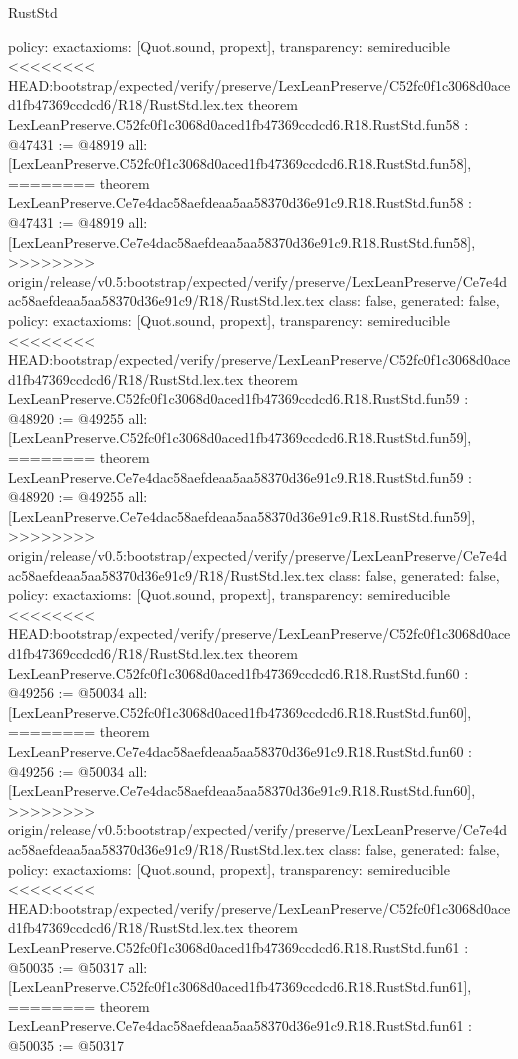 \begin{lexlean}{RustStd}
\begin{coremodule}
{\begin{coremodule}
{{{{{{{{{{{{{{{{{{{{{{{{{{{{{{{{{{{{{{{{{{{{{{{{{{{{{{{{{{{{{  policy: exact{axioms: [Quot.sound, propext]},
  transparency: semireducible
}
<<<<<<<< HEAD:bootstrap/expected/verify/preserve/LexLeanPreserve/C52fc0f1c3068d0aced1fb47369ccdcd6/R18/RustStd.lex.tex
theorem LexLeanPreserve.C52fc0f1c3068d0aced1fb47369ccdcd6.R18.RustStd.fun58 : @47431 := @48919 {
  all: [LexLeanPreserve.C52fc0f1c3068d0aced1fb47369ccdcd6.R18.RustStd.fun58],
========
theorem LexLeanPreserve.Ce7e4dac58aefdeaa5aa58370d36e91c9.R18.RustStd.fun58 : @47431 := @48919 {
  all: [LexLeanPreserve.Ce7e4dac58aefdeaa5aa58370d36e91c9.R18.RustStd.fun58],
>>>>>>>> origin/release/v0.5:bootstrap/expected/verify/preserve/LexLeanPreserve/Ce7e4dac58aefdeaa5aa58370d36e91c9/R18/RustStd.lex.tex
  class: false,
  generated: false,
  policy: exact{axioms: [Quot.sound, propext]},
  transparency: semireducible
}
<<<<<<<< HEAD:bootstrap/expected/verify/preserve/LexLeanPreserve/C52fc0f1c3068d0aced1fb47369ccdcd6/R18/RustStd.lex.tex
theorem LexLeanPreserve.C52fc0f1c3068d0aced1fb47369ccdcd6.R18.RustStd.fun59 : @48920 := @49255 {
  all: [LexLeanPreserve.C52fc0f1c3068d0aced1fb47369ccdcd6.R18.RustStd.fun59],
========
theorem LexLeanPreserve.Ce7e4dac58aefdeaa5aa58370d36e91c9.R18.RustStd.fun59 : @48920 := @49255 {
  all: [LexLeanPreserve.Ce7e4dac58aefdeaa5aa58370d36e91c9.R18.RustStd.fun59],
>>>>>>>> origin/release/v0.5:bootstrap/expected/verify/preserve/LexLeanPreserve/Ce7e4dac58aefdeaa5aa58370d36e91c9/R18/RustStd.lex.tex
  class: false,
  generated: false,
  policy: exact{axioms: [Quot.sound, propext]},
  transparency: semireducible
}
<<<<<<<< HEAD:bootstrap/expected/verify/preserve/LexLeanPreserve/C52fc0f1c3068d0aced1fb47369ccdcd6/R18/RustStd.lex.tex
theorem LexLeanPreserve.C52fc0f1c3068d0aced1fb47369ccdcd6.R18.RustStd.fun60 : @49256 := @50034 {
  all: [LexLeanPreserve.C52fc0f1c3068d0aced1fb47369ccdcd6.R18.RustStd.fun60],
========
theorem LexLeanPreserve.Ce7e4dac58aefdeaa5aa58370d36e91c9.R18.RustStd.fun60 : @49256 := @50034 {
  all: [LexLeanPreserve.Ce7e4dac58aefdeaa5aa58370d36e91c9.R18.RustStd.fun60],
>>>>>>>> origin/release/v0.5:bootstrap/expected/verify/preserve/LexLeanPreserve/Ce7e4dac58aefdeaa5aa58370d36e91c9/R18/RustStd.lex.tex
  class: false,
  generated: false,
  policy: exact{axioms: [Quot.sound, propext]},
  transparency: semireducible
}
<<<<<<<< HEAD:bootstrap/expected/verify/preserve/LexLeanPreserve/C52fc0f1c3068d0aced1fb47369ccdcd6/R18/RustStd.lex.tex
theorem LexLeanPreserve.C52fc0f1c3068d0aced1fb47369ccdcd6.R18.RustStd.fun61 : @50035 := @50317 {
  all: [LexLeanPreserve.C52fc0f1c3068d0aced1fb47369ccdcd6.R18.RustStd.fun61],
========
theorem LexLeanPreserve.Ce7e4dac58aefdeaa5aa58370d36e91c9.R18.RustStd.fun61 : @50035 := @50317 {
}}}}}}}}}}}}}}}}}}}}}}}}}}}}}}}}}}}}}}}}}}}}}}}}}}}}}}}}}}}}}}}}}
\end{coremodule}}
\end{coremodule}
\end{lexlean}
